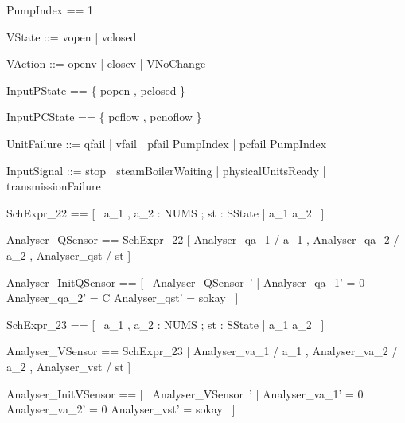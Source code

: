 \documentclass{article}
\begin{document}
\begin{zed}
	PumpIndex == 1 
\end{zed}

\begin{zed}
	VState ::= vopen | vclosed
\end{zed}

\begin{zed}
	VAction ::= openv | closev | VNoChange
\end{zed}

\begin{zed}
	InputPState == \{ popen , pclosed \}
\end{zed}

\begin{zed}
	InputPCState == \{ pcflow , pcnoflow \}
\end{zed}

\begin{zed}
	UnitFailure ::= qfail | vfail | pfail \ldata PumpIndex \rdata | pcfail \ldata PumpIndex \rdata
\end{zed}

\begin{zed}
	InputSignal ::= stop | steamBoilerWaiting | physicalUnitsReady | transmissionFailure
\end{zed}

\begin{zed}
	SchExpr\_22 == [~  a\_1 , a\_2 : NUMS ; st : SState | a\_1 \leq a\_2  ~]
\end{zed}

\begin{zed}
	Analyser\_QSensor == SchExpr\_22 [ Analyser\_qa\_1 / a\_1 , Analyser\_qa\_2 / a\_2 , Analyser\_qst / st ]
\end{zed}

\begin{zed}
	Analyser\_InitQSensor == [~  Analyser\_QSensor~' | Analyser\_qa\_1' = 0 \land Analyser\_qa\_2' = C \land Analyser\_qst' = sokay  ~]
\end{zed}

\begin{zed}
	SchExpr\_23 == [~  a\_1 , a\_2 : NUMS ; st : SState | a\_1 \leq a\_2  ~]
\end{zed}

\begin{zed}
	Analyser\_VSensor == SchExpr\_23 [ Analyser\_va\_1 / a\_1 , Analyser\_va\_2 / a\_2 , Analyser\_vst / st ]
\end{zed}

\begin{zed}
	Analyser\_InitVSensor == [~  Analyser\_VSensor~' | Analyser\_va\_1' = 0 \land Analyser\_va\_2' = 0 \land Analyser\_vst' = sokay  ~]
\end{zed}
\end{document}
